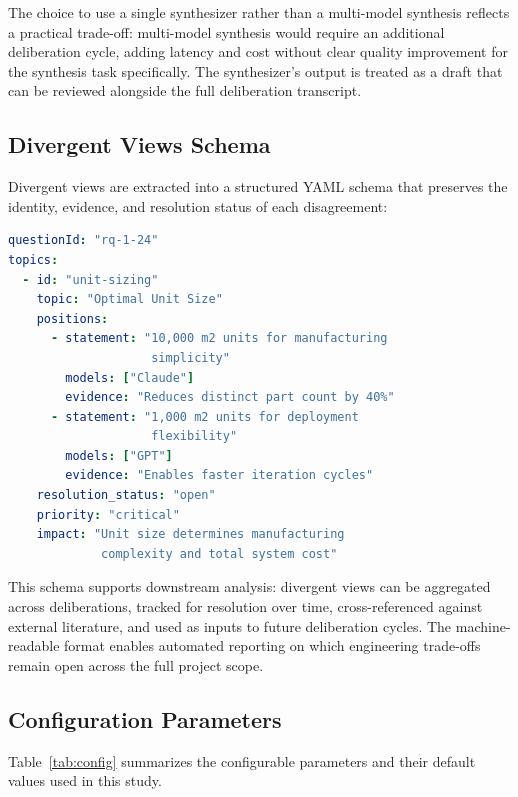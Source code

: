 \documentclass[11pt,a4paper]{article}
\begin{document}
The choice to use a single synthesizer rather than a multi-model synthesis reflects a practical trade-off: multi-model synthesis would require an additional deliberation cycle, adding latency and cost without clear quality improvement for the synthesis task specifically. The synthesizer's output is treated as a draft that can be reviewed alongside the full deliberation transcript.

\subsection{Divergent Views Schema}
\label{sec:divergent}

Divergent views are extracted into a structured YAML schema that preserves the identity, evidence, and resolution status of each disagreement:

\begin{lstlisting}[language=yaml,caption={Divergent views schema with model attribution.}]
questionId: "rq-1-24"
topics:
  - id: "unit-sizing"
    topic: "Optimal Unit Size"
    positions:
      - statement: "10,000 m2 units for manufacturing
                    simplicity"
        models: ["Claude"]
        evidence: "Reduces distinct part count by 40%"
      - statement: "1,000 m2 units for deployment
                    flexibility"
        models: ["GPT"]
        evidence: "Enables faster iteration cycles"
    resolution_status: "open"
    priority: "critical"
    impact: "Unit size determines manufacturing
             complexity and total system cost"
\end{lstlisting}

This schema supports downstream analysis: divergent views can be aggregated across deliberations, tracked for resolution over time, cross-referenced against external literature, and used as inputs to future deliberation cycles. The machine-readable format enables automated reporting on which engineering trade-offs remain open across the full project scope.

\subsection{Configuration Parameters}
\label{sec:config}

Table~\ref{tab:config} summarizes the configurable parameters and their default values used in this study.
\end{document}
